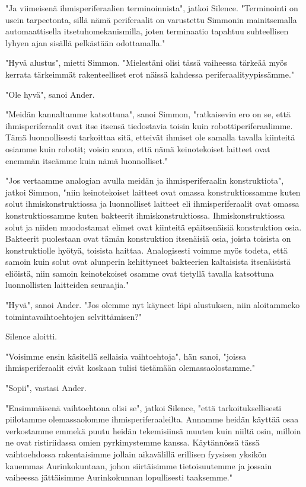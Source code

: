 "Ja viimeisenä ihmisperiferaalien terminoinnista", jatkoi Silence. "Terminointi on usein tarpeetonta, sillä nämä periferaalit on varustettu Simmonin mainitsemalla automaattisella itsetuhomekanismilla, joten terminaatio tapahtuu suhteellisen lyhyen ajan sisällä pelkästään odottamalla."


"Hyvä alustus", mietti Simmon. "Mielestäni olisi tässä vaiheessa tärkeää myös kerrata tärkeimmät rakenteelliset erot näissä kahdessa periferaalityypissämme."


"Ole hyvä", sanoi Ander.


"Meidän kannaltamme katsottuna", sanoi Simmon, "ratkaisevin ero on se, että ihmisperiferaalit ovat itse itsensä tiedostavia toisin kuin robottiperiferaalimme. Tämä luonnollisesti tarkoittaa sitä, etteivät ihmiset ole samalla tavalla kiinteitä osiamme kuin robotit; voisin sanoa, että nämä keinotekoiset laitteet ovat enemmän itseämme kuin nämä luonnolliset."


"Jos vertaamme analogian avulla meidän ja ihmisperiferaalin konstruktiota", jatkoi Simmon, "niin keinotekoiset laitteet ovat omassa konstruktiossamme kuten solut ihmiskonstruktiossa ja luonnolliset laitteet eli ihmisperiferaalit ovat omassa konstruktiossamme kuten bakteerit ihmiskonstruktiossa. Ihmiskonstruktiossa solut ja niiden muodostamat elimet ovat kiinteitä epäitsenäisiä konstruktion osia. Bakteerit puolestaan ovat tämän konstruktion itsenäisiä osia, joista toisista on konstruktiolle hyötyä, toisista haittaa. Analogisesti voimme myös todeta, että samoin kuin solut ovat alunperin kehittyneet bakteerien kaltaisista itsenäisistä eliöistä, niin samoin keinotekoiset osamme ovat tietyllä tavalla katsottuna luonnollisten laitteiden seuraajia."


"Hyvä", sanoi Ander. "Jos olemme nyt käyneet läpi alustuksen, niin aloitammeko toimintavaihtoehtojen selvittämisen?"




\psep Silence aloitti.


"Voisimme ensin käsitellä sellaisia vaihtoehtoja", hän sanoi, "joissa ihmisperiferaalit eivät koskaan tulisi tietämään olemassaolostamme."


"Sopii", vastasi Ander.


"Ensimmäisenä vaihtoehtona olisi se", jatkoi Silence, "että tarkoituksellisesti piilotamme olemassaolomme ihmisperiferaaleilta. Annamme heidän käyttää osaa verkostamme emmekä puutu heidän tekemisiinsä muuten kuin niiltä osin, milloin ne ovat ristiriidassa omien pyrkimystemme kanssa. Käytännössä tässä vaihtoehdossa rakentaisimme jollain aikavälillä erillisen fyysisen yksikön kauemmas Aurinkokuntaan, johon siirtäisimme tietoisuutemme ja jossain vaiheessa jättäisimme Aurinkokunnan lopullisesti taaksemme."


